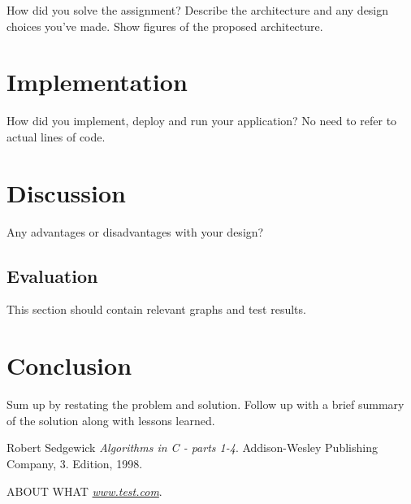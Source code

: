How did you solve the assignment? Describe the architecture and any design choices you've made. Show figures of the proposed architecture.

\section{Implementation}

How did you implement, deploy and run your application? No need to refer to actual lines of code.

\section{Discussion}

Any advantages or disadvantages with your design?

\subsection{Evaluation}

This section should contain relevant graphs and test results.

\section{Conclusion}

Sum up by restating the problem and solution. Follow up with a brief summary of the solution along with lessons learned.



\newpage{}


\begin{thebibliography}{9}

 Robert Sedgewick 
  \emph{Algorithms in C - parts 1-4}.
  Addison-Wesley Publishing Company,
  3. Edition,
  1998.

 ABOUT WHAT
  \emph{\url{www.test.com}}.

\end{thebibliography}



